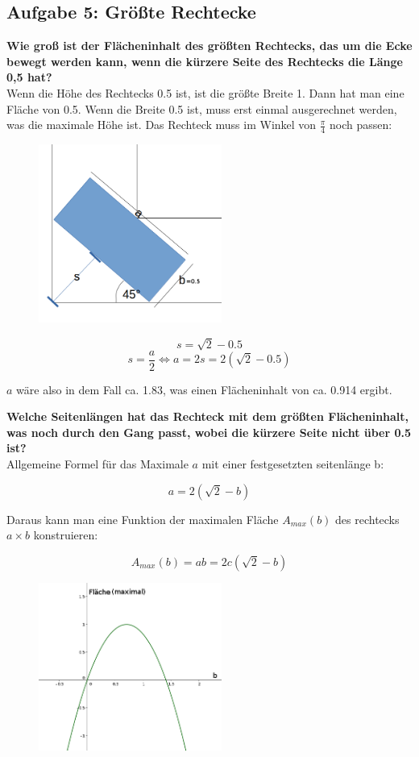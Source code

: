 \documentclass[a4paper,11pt]{article}
\begin{document}
\subsection{Aufgabe 5: Gr\"o\ss te Rechtecke}

\textbf{Wie groß ist der Flächeninhalt des größten Rechtecks, das um die Ecke bewegt werden kann,
wenn die kürzere Seite des Rechtecks die Länge 0,5 hat?} \\
Wenn die H\"ohe des Rechtecks 0.5 ist, ist die gr\"o\ss te Breite 1. Dann hat man eine Fl\"ache von 0.5.
Wenn die Breite 0.5 ist, muss erst einmal ausgerechnet werden, was die maximale H\"ohe ist. Das Rechteck muss im Winkel von $\frac{\pi}{4}$ noch passen: 

\begin{figure}[htbp] 
        \centering
        \includegraphics[width=6cm]{img/A5_1.png}
\end{figure}

\[ s = \sqrt{2} - 0.5 \]
\[ s = \frac{a}{2} \Leftrightarrow a = 2s = 2(\sqrt{2}-0.5) \]

$a$ w\"are also in dem Fall ca. 1.83, was einen Fl\"acheninhalt von ca. 0.914 ergibt.

\textbf{Welche Seitenl\"angen hat das Rechteck mit dem gr\"o\ss ten Fl\"acheninhalt, was noch durch den Gang passt, wobei die k\"urzere Seite nicht \"uber 0.5 ist?} \\
Allgemeine Formel f\"ur das Maximale $a$ mit einer festgesetzten seitenl\"ange b:

\[ a = 2(\sqrt{2}-b) \]

Daraus kann man eine Funktion der maximalen Fl\"ache $A_{max}(b)$ des rechtecks $a \times b$ konstruieren:

\[ A_{max}(b) = a b = 2c(\sqrt{2}-b) \]

\begin{figure}[htbp] 
        \centering
        \includegraphics[width=6cm]{img/A5_2.png}
\end{figure}
\end{document}
